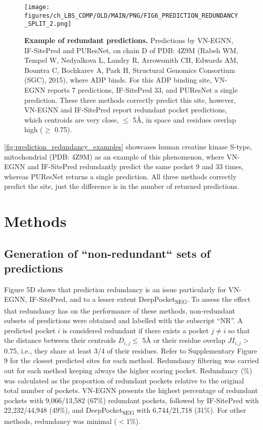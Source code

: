 \begin{figure}[htb!]
    \centering
    \texttt{[image: figures/ch\_LBS\_COMP/OLD/MAIN/PNG/FIG6\_PREDICTION\_REDUNDANCY\_SPLIT\_2.png]}
    \caption[Example of redundant predictions]{\textbf{Example of redundant predictions.} Predictions by VN-EGNN, IF-SitePred and PUResNet, on chain D of PDB: 4Z9M (Rabeh WM, Tempel W, Nedyalkova L, Landry R, Arrowsmith CH, Edwards AM, Bountra C, Bochkarev A, Park H, Structural Genomics Consortium (SGC), 2015), where ADP binds. For this ADP binding site, VN-EGNN reports 7 predictions, IF-SitePred 33, and PUResNet a single prediction. These three methods correctly predict this site, however, VN-EGNN and IF-SitePred report redundant pocket predictions, which centroids are very close, $\leq$ 5\AA{}, in space and residues overlap high ($\geq$ 0.75).}
    \label{fig:prediction_redundancy_examples}
\end{figure}

\autoref{fig:prediction_redundancy_examples} showcases human creatine kinase S-type, mitochondrial (PDB: 4Z9M) as an example of this phenomenon, where VN-EGNN and IF-SitePred redundantly predict the same pocket 9 and 33 times, whereas PUResNet returns a single prediction. All three methods correctly predict the site, just the difference is in the number of returned predictions.

\section{Methods}

\subsection{Generation of ``non-redundant`` sets of predictions}

Figure 5D shows that prediction redundancy is an issue particularly for VN-EGNN, IF-SitePred, and to a lesser extent DeepPocket\textsubscript{SEG}. To assess the effect that redundancy has on the performance of these methods, non-redundant subsets of predictions were obtained and labelled with the subscript ``NR''. A predicted pocket $i$ is considered redundant if there exists a pocket $j \neq i$ so that the distance between their centroids $D_{i,j} \leq$ 5\AA{} or their residue overlap $JI_{i,j} >$ 0.75, i.e., they share at least 3/4 of their residues. Refer to Supplementary Figure 9 for the closest predicted sites for each method. Redundancy filtering was carried out for each method keeping always the higher scoring pocket. Redundancy (\%) was calculated as the proportion of redundant pockets relative to the original total number of pockets. VN-EGNN presents the highest percentage of redundant pockets with 9,066/13,582 (67\%) redundant pockets, followed by IF-SitePred with 22,232/44,948 (49\%), and DeepPocket\textsubscript{SEG} with 6,744/21,718 (31\%). For other methods, redundancy was minimal ($<$1\%).

